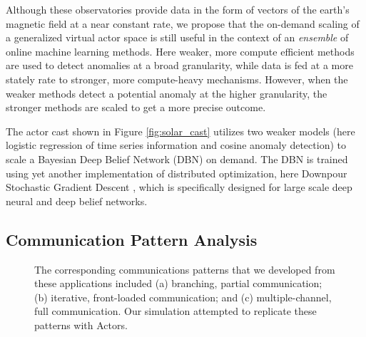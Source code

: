 \documentclass[draftclsnofoot,onecolumn,conference,11pt]{IEEEtran}
\begin{document}
Although these observatories provide data in the form of vectors of the earth's magnetic field at a near constant rate, we propose that the on-demand scaling of a generalized virtual actor space is still useful in the context of an \textit{ensemble} of online machine learning methods. Here weaker, more compute efficient methods are used to detect anomalies at a broad granularity, while data is fed at a more stately rate to stronger, more compute-heavy mechanisms. However, when the weaker methods detect a potential anomaly at the higher granularity, the stronger methods are scaled to get a more precise outcome.

The actor cast shown in Figure \ref{fig:solar_cast} utilizes two weaker models (here logistic regression of time series information and cosine anomaly detection) to scale a Bayesian Deep Belief Network (DBN) on demand. The DBN is trained using yet another implementation of distributed optimization, here Downpour Stochastic Gradient Descent \cite{dean_large_2012}, which is specifically designed for large scale deep neural and deep belief networks.

\subsection{Communication Pattern Analysis}

\begin{figure}[!t]
    \centering
    \hfil
    \hfil
    \caption{The corresponding communications patterns that we developed from these applications included (a) branching, partial communication; (b) iterative, front-loaded communication; and (c) multiple-channel, full communication. Our simulation attempted to replicate these patterns with Actors.}
    \label{fig:communications_patterns}
\end{figure}
\end{document}
